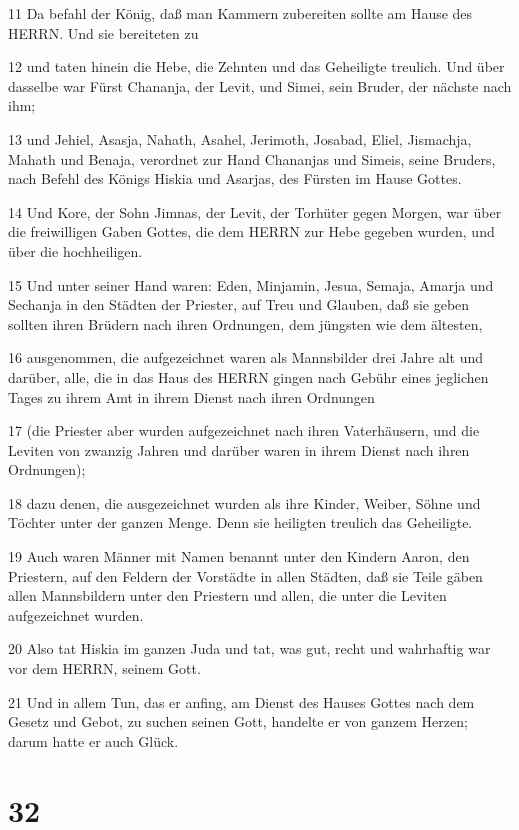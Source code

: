 \par 11 Da befahl der König, daß man Kammern zubereiten sollte am Hause des HERRN. Und sie bereiteten zu
\par 12 und taten hinein die Hebe, die Zehnten und das Geheiligte treulich. Und über dasselbe war Fürst Chananja, der Levit, und Simei, sein Bruder, der nächste nach ihm;
\par 13 und Jehiel, Asasja, Nahath, Asahel, Jerimoth, Josabad, Eliel, Jismachja, Mahath und Benaja, verordnet zur Hand Chananjas und Simeis, seine Bruders, nach Befehl des Königs Hiskia und Asarjas, des Fürsten im Hause Gottes.
\par 14 Und Kore, der Sohn Jimnas, der Levit, der Torhüter gegen Morgen, war über die freiwilligen Gaben Gottes, die dem HERRN zur Hebe gegeben wurden, und über die hochheiligen.
\par 15 Und unter seiner Hand waren: Eden, Minjamin, Jesua, Semaja, Amarja und Sechanja in den Städten der Priester, auf Treu und Glauben, daß sie geben sollten ihren Brüdern nach ihren Ordnungen, dem jüngsten wie dem ältesten,
\par 16 ausgenommen, die aufgezeichnet waren als Mannsbilder drei Jahre alt und darüber, alle, die in das Haus des HERRN gingen nach Gebühr eines jeglichen Tages zu ihrem Amt in ihrem Dienst nach ihren Ordnungen
\par 17 (die Priester aber wurden aufgezeichnet nach ihren Vaterhäusern, und die Leviten von zwanzig Jahren und darüber waren in ihrem Dienst nach ihren Ordnungen);
\par 18 dazu denen, die ausgezeichnet wurden als ihre Kinder, Weiber, Söhne und Töchter unter der ganzen Menge. Denn sie heiligten treulich das Geheiligte.
\par 19 Auch waren Männer mit Namen benannt unter den Kindern Aaron, den Priestern, auf den Feldern der Vorstädte in allen Städten, daß sie Teile gäben allen Mannsbildern unter den Priestern und allen, die unter die Leviten aufgezeichnet wurden.
\par 20 Also tat Hiskia im ganzen Juda und tat, was gut, recht und wahrhaftig war vor dem HERRN, seinem Gott.
\par 21 Und in allem Tun, das er anfing, am Dienst des Hauses Gottes nach dem Gesetz und Gebot, zu suchen seinen Gott, handelte er von ganzem Herzen; darum hatte er auch Glück.

\chapter{32}

